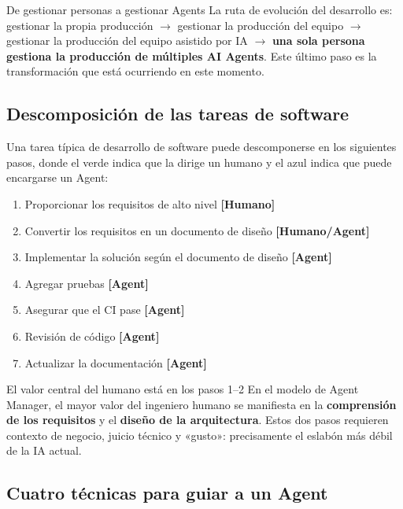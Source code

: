 \documentclass[a4paper]{article}
\begin{document}
\begin{importantbox}{De gestionar personas a gestionar Agents}
La ruta de evolución del desarrollo es: gestionar la propia producción $\rightarrow$ gestionar la producción del equipo $\rightarrow$ gestionar la producción del equipo asistido por IA $\rightarrow$ \textbf{una sola persona gestiona la producción de múltiples AI Agents}. Este último paso es la transformación que está ocurriendo en este momento.
\end{importantbox}

\subsection{Descomposición de las tareas de software}

Una tarea típica de desarrollo de software puede descomponerse en los siguientes pasos, donde el verde indica que la dirige un humano y el azul indica que puede encargarse un Agent:

\begin{enumerate}
    \item Proporcionar los requisitos de alto nivel \textbf{{[}Humano{]}}
    \item Convertir los requisitos en un documento de diseño \textbf{{[}Humano/Agent{]}}
    \item Implementar la solución según el documento de diseño \textbf{{[}Agent{]}}
    \item Agregar pruebas \textbf{{[}Agent{]}}
    \item Asegurar que el CI pase \textbf{{[}Agent{]}}
    \item Revisión de código \textbf{{[}Agent{]}}
    \item Actualizar la documentación \textbf{{[}Agent{]}}
\end{enumerate}

\begin{knowledgebox}{El valor central del humano está en los pasos 1--2}
En el modelo de Agent Manager, el mayor valor del ingeniero humano se manifiesta en la \textbf{comprensión de los requisitos} y el \textbf{diseño de la arquitectura}. Estos dos pasos requieren contexto de negocio, juicio técnico y «gusto»: precisamente el eslabón más débil de la IA actual.
\end{knowledgebox}

\subsection{Cuatro técnicas para guiar a un Agent}
\end{document}
